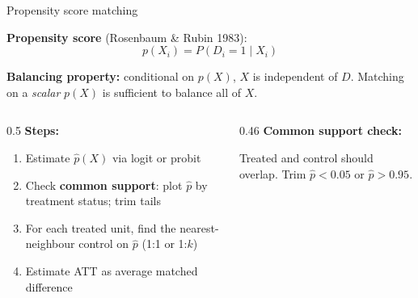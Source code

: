 \documentclass[aspectratio=169, 10pt]{beamer}
\begin{document}

\begin{frame}{Propensity score matching}

  \textbf{Propensity score} (Rosenbaum \& Rubin 1983):
  \[
    p(X_i) = P(D_i = 1 \mid X_i)
  \]

  \textbf{Balancing property:} conditional on $p(X)$, $X$ is independent of $D$. Matching on a \emph{scalar} $p(X)$ is sufficient to balance all of $X$.

  \medskip
  \begin{columns}[T]
    \begin{column}{0.5\textwidth}
      \textbf{Steps:}
      \begin{enumerate}
        \item Estimate $\hat{p}(X)$ via logit or probit
        \item Check \textbf{common support}: plot $\hat{p}$ by treatment status; trim tails
        \item For each treated unit, find the nearest-neighbour control on $\hat{p}$ (1:1 or 1:$k$)
        \item Estimate ATT as average matched difference
      \end{enumerate}
    \end{column}
    \begin{column}{0.46\textwidth}
      \textbf{Common support check:}
      \begin{center}
      \end{center}
      \small Treated and control should overlap. Trim $\hat{p} < 0.05$ or $\hat{p} > 0.95$.
    \end{column}
  \end{columns}
\end{frame}
\end{document}
